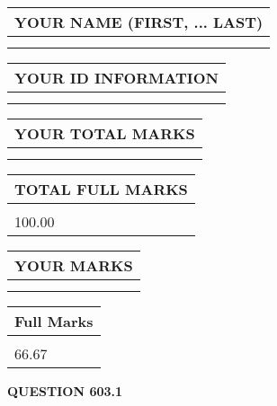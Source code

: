 \documentclass{ctexart}
\begin{document}
   
   
   
\newpage 
\setcounter{page}{ 
   603001 } 
   
   
   
   
\noindent\begin{tabular}{|l|}
\hline
YOUR NAME (FIRST, ... LAST)  \\
\hline
 \\ 
 \\ 
\hline
\end{tabular}
\hspace{0.05in} \begin{tabular}{|l|}
\hline
 YOUR   ID   INFORMATION  \\
\hline
 \\ 
 \\ 
\hline
\end{tabular}
   
   
\vspace{0.2in}\noindent\begin{tabular}{|l|}
\hline
YOUR TOTAL MARKS  \\
\hline
 \\ 
 \\ 
\hline
\end{tabular}
\hspace{0.05in} \begin{tabular}{|l|}
\hline
TOTAL FULL MARKS  \\
\hline
 \\ 
100.00 \\
\hline
\end{tabular}
   
   
 \vspace{0.2in}
 
 
 
 
   
   
  
\vspace{0.2in}
  
\noindent\begin{tabular}{|l|}
\hline
 YOUR MARKS  \\
\hline
 \\ 
 \\ 
\hline
\end{tabular}
\hspace{0.05in} \begin{tabular}{|l|}
\hline
 Full Marks  \\
\hline
 \\ 
66.67 \\
\hline
\end{tabular}
{\textbf{\Large{QUESTION
603.1 
}}}
  
\end{document}
